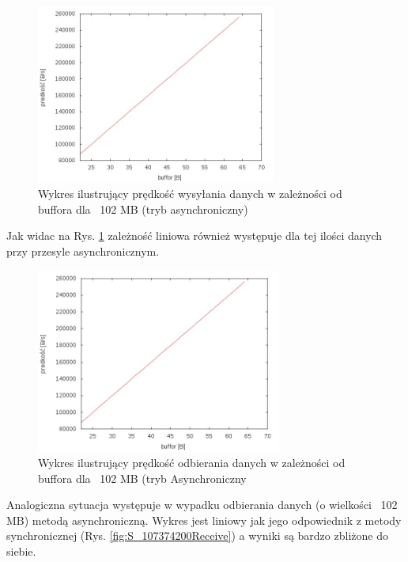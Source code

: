 \documentclass{BscUS}
\begin{document}
\begin{figure}[H]
{
\centering
\includegraphics[width=0.7\textwidth]{./img/A_107374200Send}
\caption{Wykres ilustrujący prędkość wysyłania danych w zależności od buffora dla ~102 MB (tryb asynchroniczny)}
\label{fig:A_107374200Send}
}

\end{figure}

\noindent Jak widac na Rys. \ref{fig:A_107374200Send} zależność liniowa również występuje dla tej ilości danych przy przesyle asynchronicznym.


\begin{figure}[H]
{
\centering
\includegraphics[width=0.72\textwidth]{./img/A_107374200Receive}
\caption{Wykres ilustrujący prędkość odbierania danych w zależności od buffora dla ~102 MB (tryb Asynchroniczny}
\label{fig:A_107374200Receive}
}
\end{figure}
\noindent Analogiczna sytuacja występuje w wypadku odbierania danych (o wielkości ~102 MB) metodą asynchroniczną. Wykres jest liniowy jak jego odpowiednik z metody synchronicznej (Rys. \ref{fig:S_107374200Receive}) a wyniki są bardzo zbliżone do siebie.
\end{document}
